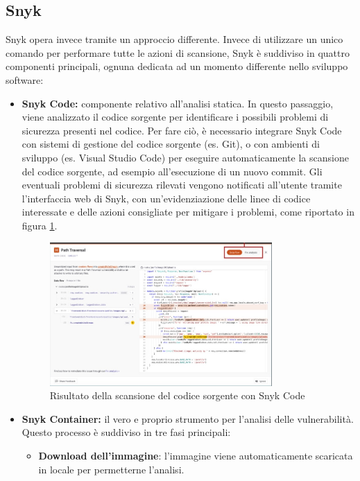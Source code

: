 \subsection{Snyk}
Snyk opera invece tramite un approccio differente. Invece di utilizzare un unico comando per performare tutte le azioni di scansione, Snyk è suddiviso in quattro componenti principali, ognuna dedicata ad un momento differente nello sviluppo software:
\begin{itemize}
   \item \textbf{Snyk Code:} componente relativo all'analisi statica. In questo passaggio, viene analizzato il codice sorgente per identificare i possibili problemi di sicurezza presenti nel codice. Per fare ciò, è necessario integrare Snyk Code con sistemi di gestione del codice sorgente (es. Git), o con ambienti di sviluppo (es. Visual Studio Code) per eseguire automaticamente la scansione del codice sorgente, ad esempio all'esecuzione di un nuovo commit. Gli eventuali problemi di sicurezza rilevati vengono notificati all'utente tramite l'interfaccia web di Snyk, con un'evidenziazione delle linee di codice interessate e delle azioni consigliate per mitigare i problemi, come riportato in figura \ref{fig:snyk_code}.
         \begin{figure}[H]
            \centering
            \includegraphics[width=0.8\textwidth]{immagini/capitolo1/snyk_code.jpg}
            \caption{Risultato della scansione del codice sorgente con Snyk Code}
            \label{fig:snyk_code}
         \end{figure}
   \item \textbf{Snyk Container:} il vero e proprio strumento per l'analisi delle vulnerabilità. Questo processo è suddiviso in tre fasi principali:
         \begin{itemize}
            \item \textbf{Download dell'immagine}: l'immagine viene automaticamente scaricata in locale per permetterne l'analisi.

\end{itemize}
\end{itemize}

